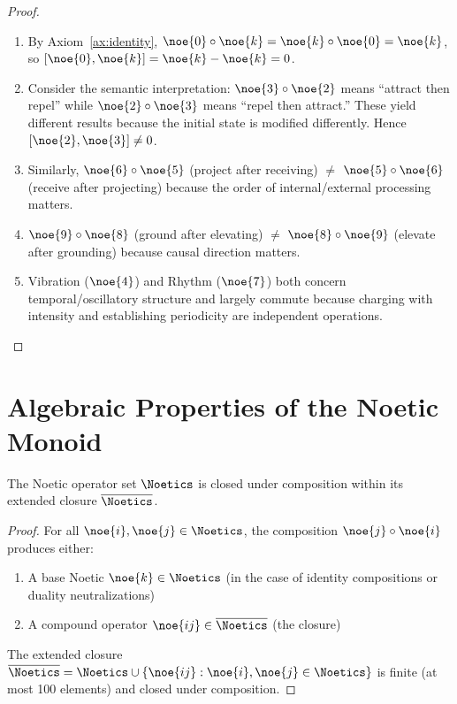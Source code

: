 \begin{proof}
\begin{enumerate}
  \item By Axiom~\ref{ax:identity}, $\noe{0} \circ \noe{k} = \noe{k} \circ \noe{0} = \noe{k}$, so $[\noe{0}, \noe{k}] = \noe{k} - \noe{k} = 0$.

  \item Consider the semantic interpretation: $\noe{3} \circ \noe{2}$ means ``attract then repel'' while $\noe{2} \circ \noe{3}$ means ``repel then attract.'' These yield different results because the initial state is modified differently. Hence $[\noe{2}, \noe{3}] \neq 0$.

  \item Similarly, $\noe{6} \circ \noe{5}$ (project after receiving) $\neq$ $\noe{5} \circ \noe{6}$ (receive after projecting) because the order of internal/external processing matters.

  \item $\noe{9} \circ \noe{8}$ (ground after elevating) $\neq$ $\noe{8} \circ \noe{9}$ (elevate after grounding) because causal direction matters.

  \item Vibration ($\noe{4}$) and Rhythm ($\noe{7}$) both concern temporal/oscillatory structure and largely commute because charging with intensity and establishing periodicity are independent operations.
\end{enumerate}
\end{proof}

\section{Algebraic Properties of the Noetic Monoid}

\begin{theorem}
\label{thm:closure}
The Noetic operator set $\Noetics$ is closed under composition within its extended closure $\overline{\Noetics}$.
\end{theorem}

\begin{proof}
For all $\noe{i}, \noe{j} \in \Noetics$, the composition $\noe{j} \circ \noe{i}$ produces either:
\begin{enumerate}
  \item A base Noetic $\noe{k} \in \Noetics$ (in the case of identity compositions or duality neutralizations)
  \item A compound operator $\noe{ij} \in \overline{\Noetics}$ (the closure)
\end{enumerate}
The extended closure $\overline{\Noetics} = \Noetics \cup \{\noe{ij} : \noe{i}, \noe{j} \in \Noetics\}$ is finite (at most 100 elements) and closed under composition.
\end{proof}

